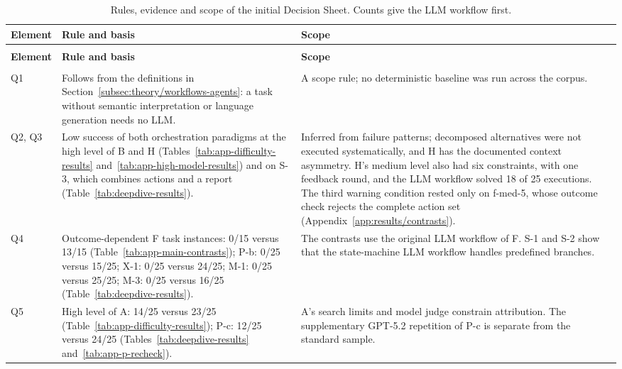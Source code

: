 \begingroup
\renewcommand{\baselinestretch}{1}
\small
\setlength{\tabcolsep}{4pt}
\renewcommand{\arraystretch}{1.08}
\begin{longtable}{>{\raggedright\arraybackslash}p{} >{\raggedright\arraybackslash}p{} >{\raggedright\arraybackslash}p{}}
\caption[Rules, evidence and scope of the initial Decision Sheet]{Rules, evidence and scope of the initial Decision Sheet. Counts give the LLM workflow first.}\label{tab:initial-evidence} \\
\toprule
\textbf{Element} & \textbf{Rule and basis} & \textbf{Scope} \\
\midrule
\endfirsthead
\multicolumn{3}{l}{\tablename~\thetable{} (continued)} \\
\toprule
\textbf{Element} & \textbf{Rule and basis} & \textbf{Scope} \\
\midrule
\endhead
\midrule
\multicolumn{3}{r}{\emph{Continued on the next page.}} \\
\endfoot
\bottomrule
\endlastfoot
Q1 & Follows from the definitions in Section~\ref{subsec:theory/workflows-agents}: a task without semantic interpretation or language generation needs no LLM. & A scope rule; no deterministic baseline was run across the corpus. \\
\addlinespace[2.5pt]
Q2, Q3 & Low success of both orchestration paradigms at the high level of B and H (Tables~\ref{tab:app-difficulty-results} and~\ref{tab:app-high-model-results}) and on S-3, which combines actions and a report (Table~\ref{tab:deepdive-results}). & Inferred from failure patterns; decomposed alternatives were not executed systematically, and H has the documented context asymmetry. H's medium level also had six constraints, with one feedback round, and the LLM workflow solved 18 of 25 executions. The third warning condition rested only on f-med-5, whose outcome check rejects the complete action set (Appendix~\ref{app:results/contrasts}). \\
\addlinespace[2.5pt]
Q4 & Outcome-dependent F task instances: 0/15 versus 13/15 (Table~\ref{tab:app-main-contrasts}); P-b: 0/25 versus 15/25; X-1: 0/25 versus 24/25; M-1: 0/25 versus 25/25; M-3: 0/25 versus 16/25 (Table~\ref{tab:deepdive-results}). & The contrasts use the original LLM workflow of F. S-1 and S-2 show that the state-machine LLM workflow handles predefined branches. \\
\addlinespace[2.5pt]
Q5 & High level of A: 14/25 versus 23/25 (Table~\ref{tab:app-difficulty-results}); P-c: 12/25 versus 24/25 (Tables~\ref{tab:deepdive-results} and~\ref{tab:app-p-recheck}). & A's search limits and model judge constrain attribution. The supplementary GPT-5.2 repetition of P-c is separate from the standard sample. \\

\end{longtable}
